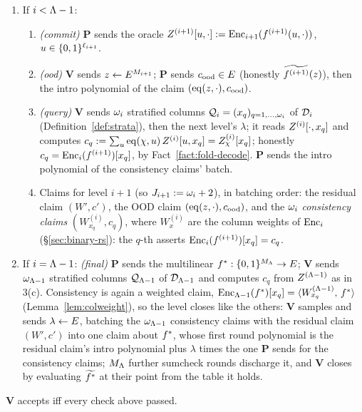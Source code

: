 \begin{protocol}
\begin{enumerate}[itemsep=0.5pt,topsep=2pt]
\item If $i < \Lambda - 1$:
\begin{enumerate}[itemsep=0.5pt,topsep=1pt,label=(\alph*)]
\item \emph{(commit)} $\mathbf{P}$ sends the oracle $Z^{(i+1)}[u, \cdot] := \mathrm{Enc}_{i+1}(f^{(i+1)}(u, \cdot))$, $u \in \{0,1\}^{\ell_{i+1}}$.
\item \emph{(ood)} $\mathbf{V}$ sends $z \leftarrow E^{M_{i+1}}$; $\mathbf{P}$ sends $c_{\mathrm{ood}} \in E$ (honestly $\widetilde{f^{(i+1)}}(z)$), then the intro polynomial of the claim $(\operatorname{eq}(z, \cdot), c_{\mathrm{ood}})$.
\item \emph{(query)} $\mathbf{V}$ sends $\omega_i$ stratified columns $\mathcal{Q}_i = (x_q)_{q = 1, \dots, \omega_i}$ of $\mathcal{D}_i$ (Definition~\ref{def:strata}), then the next level's $\lambda$; it reads $Z^{(i)}[\cdot, x_q]$ and computes $c_q := \sum_{u} \operatorname{eq}(\chi, u)\, Z^{(i)}[u, x_q] = Z^{(i)}_\chi[x_q]$; honestly $c_q = \mathrm{Enc}_i(f^{(i+1)})[x_q]$, by Fact~\ref{fact:fold-decode}. $\mathbf{P}$ sends the intro polynomial of the consistency claims' batch.
\item Claims for level $i+1$ (so $J_{i+1} := \omega_i + 2$), in batching order: the residual claim $(W', c')$, the OOD claim $(\operatorname{eq}(z, \cdot), c_{\mathrm{ood}})$, and the $\omega_i$ \emph{consistency claims} $(W^{(i)}_{x_q}, c_q)$, where $W^{(i)}_x$ are the column weights of $\mathrm{Enc}_i$ (\S\ref{sec:binary-rs}): the $q$-th asserts $\mathrm{Enc}_i(f^{(i+1)})[x_q] = c_q$.
\end{enumerate}
\item If $i = \Lambda - 1$: \emph{(final)} $\mathbf{P}$ sends the multilinear $f^{\ast} : \{0,1\}^{M_\Lambda} \to E$; $\mathbf{V}$ sends $\omega_{\Lambda-1}$ stratified columns $\mathcal{Q}_{\Lambda-1}$ of $\mathcal{D}_{\Lambda-1}$ and computes $c_q$ from $Z^{(\Lambda-1)}$ as in 3(c). Consistency is again a weighted claim, $\mathrm{Enc}_{\Lambda-1}(f^{\ast})[x_q] = \langle W^{(\Lambda-1)}_{x_q},\, f^{\ast} \rangle$ (Lemma~\ref{lem:colweight}), so the level closes like the others: $\mathbf{V}$ samples and sends $\lambda \leftarrow E$, batching the $\omega_{\Lambda-1}$ consistency claims with the residual claim $(W', c')$ into one claim about $f^{\ast}$, whose first round polynomial is the residual claim's intro polynomial plus $\lambda$ times the one $\mathbf{P}$ sends for the consistency claims; $M_\Lambda$ further sumcheck rounds discharge it, and $\mathbf{V}$ closes by evaluating $\widetilde{f^{\ast}}$ at their point from the table it holds.
\end{enumerate}
$\mathbf{V}$ accepts iff every check above passed.
\end{protocol}

